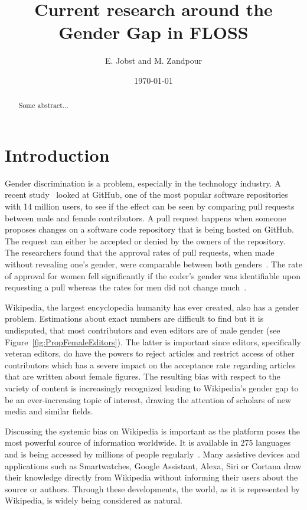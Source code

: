 \documentclass[a4paper, 11pt]{article}
\title{Current research around the Gender Gap in FLOSS}
\begin{document}
\date{\today}
\author{E. Jobst and M. Zandpour}
\maketitle

\begin{abstract}
Some abstract...
\end{abstract}

\section{Introduction} \label{sec:intro}
Gender discrimination is a problem, especially in the technology industry. A recent study~\cite{terrell2017gender} looked at GitHub, one of the most popular software repositories with 14 million users, to see if the effect can be seen by comparing pull requests between male and female contributors. A pull request happens when someone proposes changes on a software code repository that is being hosted on GitHub. The request can either be accepted or denied by the owners of the repository. The researchers found that the approval rates of pull requests, when made without revealing one’s gender, were comparable between both genders~\cite{terrell2017gender}. The rate of approval for women fell significantly if the coder’s gender was identifiable upon requesting a pull whereas the rates for men did not change much~\cite{terrell2017gender}.

Wikipedia, the largest encyclopedia humanity has ever created, also has a gender problem. Estimations about exact numbers are difficult to find but it is undisputed, that most contributors and even editors are of male gender (see Figure~\ref{fig:PropFemaleEditors}). The latter is important since editors, specifically veteran editors, do have the powers to reject articles and restrict access of other contributors which has a severe impact on the acceptance rate regarding articles that are written about female figures. The resulting bias with respect to the variety of content is increasingly recognized leading to Wikipedia’s gender gap to be an ever-increasing topic of interest, drawing the attention of scholars of new media and similar fields.

Discussing the systemic bias on Wikipedia is important as the platform poses the most powerful source of information worldwide. It is available in 275 languages and is being accessed by millions of people regularly~\cite{zachte2018}. Many assistive devices and applications such as Smartwatches, Google Assistant, Alexa, Siri or Cortana draw their knowledge directly from Wikipedia without informing their users about the source or authors. Through these developments, the world, as it is represented by Wikipedia, is widely being considered as natural.
\end{document}
